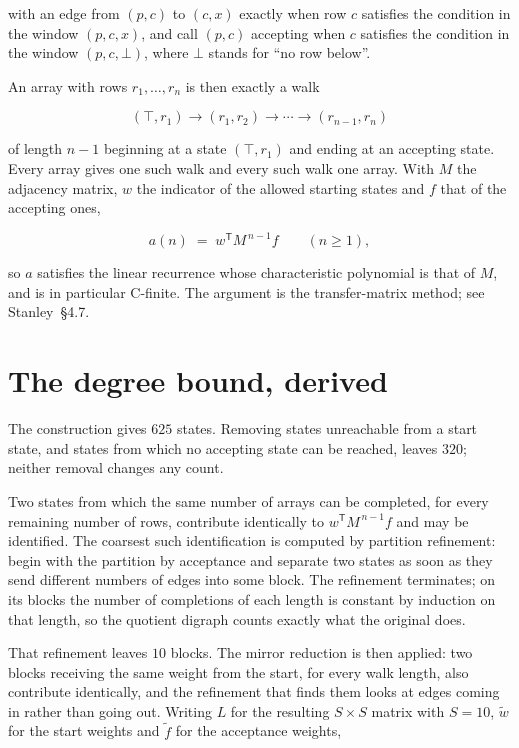 \documentclass[11pt]{article}
\theoremstyle{definition}
\begin{document}
with an edge from $(p,c)$ to $(c,x)$ exactly when row $c$ satisfies the condition in the window $(p,c,x)$, and call $(p,c)$ accepting when $c$ satisfies the condition in the window $(p,c,\bot)$, where $\bot$ stands for ``no row below''.

An array with rows $r_1,\dots,r_n$ is then exactly a walk

\[(\top,r_1) \to (r_1,r_2) \to \cdots \to (r_{n-1},r_n)\]

of length $n-1$ beginning at a state $(\top,r_1)$ and ending at an accepting state. Every array gives one such walk and every such walk one array. With $M$ the adjacency matrix, $w$ the indicator of the allowed starting states and $f$ that of the accepting ones,

\[a(n) \;=\; w^{\mathsf T} M^{\,n-1} f \qquad (n \ge 1),\]

so $a$ satisfies the linear recurrence whose characteristic polynomial is that of $M$, and is in particular C-finite. The argument is the transfer-matrix method; see Stanley~\S4.7.

\section{The degree bound, derived}

The construction gives $625$ states. Removing states unreachable from a start state, and states from which no accepting state can be reached, leaves $320$; neither removal changes any count.

Two states from which the same number of arrays can be completed, for every remaining number of rows, contribute identically to $w^{\mathsf T}M^{\,n-1}f$ and may be identified. The coarsest such identification is computed by partition refinement: begin with the partition by acceptance and separate two states as soon as they send different numbers of edges into some block. The refinement terminates; on its blocks the number of completions of each length is constant by induction on that length, so the quotient digraph counts exactly what the original does.

That refinement leaves $10$ blocks. The mirror reduction is then applied: two blocks receiving the same weight from the start, for every walk length, also contribute identically, and the refinement that finds them looks at edges coming in rather than going out. Writing $L$ for the resulting $S \times S$ matrix with $S = 10$, $\tilde w$ for the start weights and $\tilde f$ for the acceptance weights,
\end{document}
